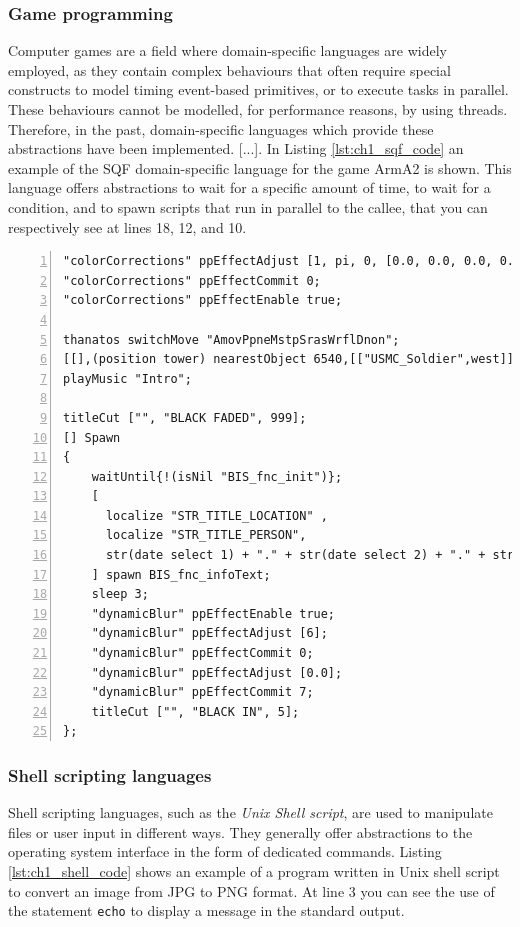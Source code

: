 \subsubsection*{Game programming}
Computer games are a field where domain-specific languages are widely employed, as they contain complex behaviours that often require special constructs to model timing event-based primitives, or to execute tasks in parallel. These behaviours cannot be modelled, for performance reasons, by using threads. Therefore, in the past, domain-specific languages which provide these abstractions have been implemented. [...]. In Listing \ref{lst:ch1_sqf_code} an example of the SQF domain-specific language for the game ArmA2 is shown. This language offers abstractions to wait for a specific amount of time, to wait for a condition, and to spawn scripts that run in parallel to the callee, that you can respectively see at lines 18, 12, and 10.

\begin{lstlisting}[numbers = left, caption = ArmA 2 scripting language, label = lst:ch1_sqf_code]
"colorCorrections" ppEffectAdjust [1, pi, 0, [0.0, 0.0, 0.0, 0.0], [0.05, 0.18, 0.45, 0.5], [0.5, 0.5, 0.5, 0.0]];  
"colorCorrections" ppEffectCommit 0;  
"colorCorrections" ppEffectEnable true;

thanatos switchMove "AmovPpneMstpSrasWrflDnon";
[[],(position tower) nearestObject 6540,[["USMC_Soldier",west]],4,true,[]] execVM "patrolBuilding.sqf";
playMusic "Intro";

titleCut ["", "BLACK FADED", 999];
[] Spawn 
{
	waitUntil{!(isNil "BIS_fnc_init")};
	[
	  localize "STR_TITLE_LOCATION" ,
	  localize "STR_TITLE_PERSON",
	  str(date select 1) + "." + str(date select 2) + "." + str(date select 0)
	] spawn BIS_fnc_infoText;
	sleep 3;
	"dynamicBlur" ppEffectEnable true;   
	"dynamicBlur" ppEffectAdjust [6];   
	"dynamicBlur" ppEffectCommit 0;     
	"dynamicBlur" ppEffectAdjust [0.0];  
	"dynamicBlur" ppEffectCommit 7;
	titleCut ["", "BLACK IN", 5];
};
\end{lstlisting}

\subsubsection*{Shell scripting languages}
Shell scripting languages, such as the \textit{Unix Shell script}, are used to manipulate files or user input in different ways. They generally offer abstractions to the operating system interface in the form of dedicated commands. Listing \ref{lst:ch1_shell_code} shows an example of a program written in Unix shell script to convert an image from JPG to PNG format. At line 3 you can see the use of the statement \texttt{echo} to display a message in the standard output.

